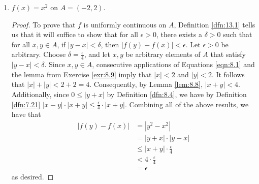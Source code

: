 \documentclass[../main.tex]{subfiles}
\begin{document}
\begin{exercise}
\begin{enumerate}[label={(\alph*)}]
\begin{proof}
            To prove that $f$ is not uniformly continuous on $A$, Definition \ref{dfn:13.1} tells us that it will suffice to find an $\epsilon>0$ for which no $\delta>0$ exists such that for all $x,y\in A$, if $|y-x|<\delta$, then $|y^2-x^2|<\epsilon$. Let $\epsilon=2$, and suppose for the sake of contradiction that $\delta>0$ is a number such that for all $x,y\in A$, if $|y-x|<\delta$, then $|y^2-x^2|<2$. By Theorem \ref{trm:5.2}, there exists a number $y$ such that $0<y<\delta$. Since $-\delta<0<y<\delta$ by Lemma \ref{lem:7.23}, we have by the lemma from Exercise \ref{exr:8.9}, that $|y|<\delta$. Consequently, $|(y+n)-n|<\delta$. It follows by the above that $|(y+n)^2-n^2|=|y^2+2yn|<2$. If we now let $n=\frac{1}{y}$, then $|y^2+2|<2$. But since $y>0$, we have that $y^2>0$ by Lemma \ref{lem:7.26}. It follows that $y^2+2>2$ by Definition \ref{dfn:7.21}. Therefore, by Definition \ref{dfn:8.4}, we can also show that $|y^2+2|>2$, a contradiction.
        \end{proof}
        \item $f(x)=x^2$ on $A=(-2,2)$.
        \begin{proof}
            To prove that $f$ is uniformly continuous on $A$, Definition \ref{dfn:13.1} tells us that it will suffice to show that for all $\epsilon>0$, there exists a $\delta>0$ such that for all $x,y\in A$, if $|y-x|<\delta$, then $|f(y)-f(x)|<\epsilon$. Let $\epsilon>0$ be arbitrary. Choose $\delta=\frac{\epsilon}{4}$, and let $x,y$ be arbitrary elements of $A$ that satisfy $|y-x|<\delta$. Since $x,y\in A$, consecutive applications of Equations \ref{eqn:8.1} and the lemma from Exercise \ref{exr:8.9} imply that $|x|<2$ and $|y|<2$. It follows that $|x|+|y|<2+2=4$. Consequently, by Lemma \ref{lem:8.8}, $|x+y|<4$. Additionally, since $0\leq|y+x|$ by Definition \ref{dfn:8.4}, we have by Definition \ref{dfn:7.21} $|x-y|\cdot|x+y|\leq\frac{\epsilon}{4}\cdot|x+y|$. Combining all of the above results, we have that
            \begingroup
            \allowdisplaybreaks
            \begin{align*}
                |f(y)-f(x)| &= |y^2-x^2|\\
                &= |y+x|\cdot|y-x|\\
                &\leq |x+y|\cdot\frac{\epsilon}{4}\\
                &< 4\cdot\frac{\epsilon}{4}\\
                &= \epsilon
            \end{align*}
            \endgroup
            as desired.
        \end{proof}

\end{enumerate}
\end{exercise}
\end{document}
